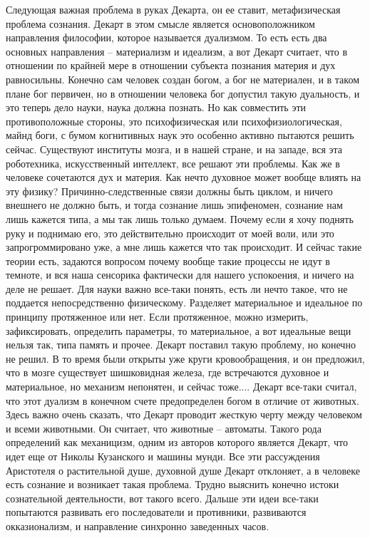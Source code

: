 \documentclass[a4paper, 12pt]{article}
\begin{document}
Следующая важная проблема в руках Декарта, он ее ставит, метафизическая 
проблема сознания. Декарт в этом смысле является основоположником 
направления философии, которое называется дуализмом. То есть есть два 
основных направления -- материализм и идеализм, а вот Декарт считает, 
что в отношении по крайней мере в отношении субъекта познания материя 
и дух равносильны. Конечно сам человек создан богом, а бог не 
материален, и в таком плане бог первичен, но в отношении человека бог 
допустил такую дуальность, и это теперь дело науки, наука должна 
познать. Но как совместить эти противоположные стороны, это 
психофизическая или психофизиологическая, майнд боги, с бумом 
когнитивных наук это особенно активно пытаются решить сейчас. Существуют 
институты мозга, и в нашей стране, и на западе, вся эта роботехника, 
искусственный интеллект, все решают эти проблемы. Как же в человеке 
сочетаются дух и материя. Как нечто духовное может вообще влиять на эту 
физику? Причинно-следственные связи должны быть циклом, и ничего 
внешнего не должно быть, и тогда сознание лишь эпифеномен, сознание нам 
лишь кажется типа, а мы так лишь только думаем. Почему если я хочу 
поднять руку и поднимаю его, это действительно происходит от моей воли, 
или это запрогроммировано уже, а мне лишь кажется что так происходит. 
И сейчас такие теории есть, задаются вопросом почему вообще такие 
процессы не идут в темноте, и вся наша сенсорика фактически для нашего 
успокоения, и ничего на деле не решает. Для науки важно все-таки понять, 
есть ли нечто такое, что не поддается непосредственно физическому. 
Разделяет материальное и идеальное по принципу протяженное или нет. Если 
протяженное, можно измерить, зафиксировать, определить параметры, то 
материальное, а вот идеальные вещи нельзя так, типа память и прочее. 
Декарт поставил такую проблему, но конечно не решил. В то время были 
открыты уже круги кровообращения, и он предложил, что в мозге существует 
шишковидная железа, где встречаются духовное и материальное, но механизм 
непонятен, и сейчас тоже.... Декарт все-таки считал, что этот дуализм 
в конечном счете предопределен богом в отличие от животных. Здесь важно 
очень сказать, что Декарт проводит жесткую черту между человеком и всеми 
животными. Он считает, что животные -- автоматы. Такого рода определений 
как механицизм, одним из авторов которого является Декарт, что идет еще 
от Николы Кузанского и машины мунди. Все эти рассуждения Аристотеля 
о растительной душе, духовной душе Декарт отклоняет, а в человеке есть 
сознание и возникает такая проблема. Трудно выяснить конечно истоки 
сознательной деятельности, вот такого всего. Дальше эти идеи все-таки 
попытаются развивать его последователи и противники, развиваются 
окказионализм, и направление синхронно заведенных часов.
\end{document}
